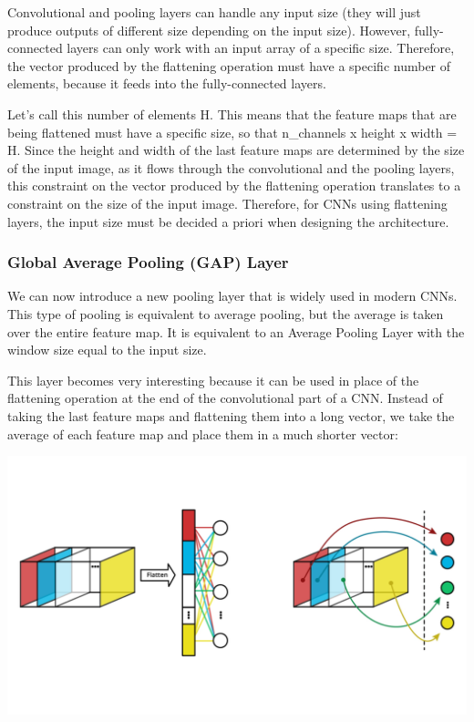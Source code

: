 Convolutional and pooling layers can handle any input size (they will just produce outputs of different size depending on the input size). However, fully-connected layers can only work with an input array of a specific size. Therefore, the vector produced by the flattening operation must have a specific number of elements, because it feeds into the fully-connected layers. \newline

Let's call this number of elements H. This means that the feature maps that are being flattened must have a specific size, so that n\_channels x height x width = H. Since the height and width of the last feature maps are determined by the size of the input image, as it flows through the convolutional and the pooling layers, this constraint on the vector produced by the flattening operation translates to a constraint on the size of the input image. Therefore, for CNNs using flattening layers, the input size must be decided a priori when designing the architecture.

\subsubsection{Global Average Pooling (GAP) Layer}

We can now introduce a new pooling layer that is widely used in modern CNNs. This type of pooling is equivalent to average pooling, but the average is taken over the entire feature map. It is equivalent to an Average Pooling Layer with the window size equal to the input size.\newline

This layer becomes very interesting because it can be used in place of the flattening operation at the end of the convolutional part of a CNN. Instead of taking the last feature maps and flattening them into a long vector, we take the average of each feature map and place them in a much shorter vector:

\includegraphics[width=1\linewidth]{img//cnn//transfer/dlnd-refresh-c2-cd1821-l2-2.jpeg}

